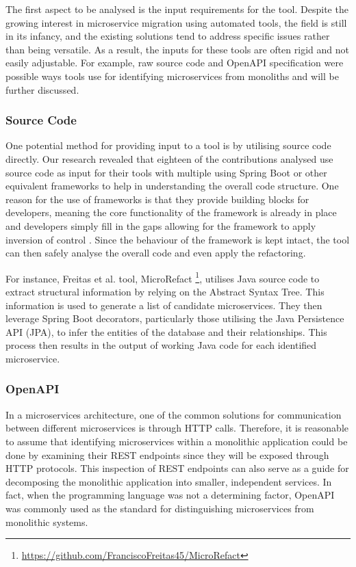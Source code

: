 \documentclass[conference]{IEEEtran}
\begin{document}
The first aspect to be analysed is the input requirements for the tool. Despite
the growing interest in microservice migration using automated tools, the field
is still in its infancy, and the existing solutions tend to address specific
issues rather than being versatile. As a result, the inputs for these tools are
often rigid and not easily adjustable. For example, raw source code and OpenAPI
specification were possible ways tools use for identifying microservices from
monoliths and will be further discussed.

\subsubsection*{Source Code}

One potential method for providing input to a tool is by utilising source code
directly. Our research revealed that eighteen of the contributions analysed use
source code as input for their tools with multiple using Spring Boot or other
equivalent frameworks to help in understanding the overall code structure. One
reason for the use of frameworks is that they provide building blocks for
developers, meaning the core functionality of the framework is already in place
and developers simply fill in the gaps allowing for the framework to apply
inversion of control \cite{gamma1995design}. Since the behaviour of the
framework is kept intact, the tool can then safely analyse the overall code and
even apply the refactoring.

For instance, Freitas et al.  tool, MicroRefact
\footnote{\url{https://github.com/FranciscoFreitas45/MicroRefact}}, utilises
Java source code to extract structural information by relying on the Abstract
Syntax Tree. This information is used to generate a list of candidate
microservices. They then leverage Spring Boot decorators, particularly those
utilising the Java Persistence API (JPA), to infer the entities of the database
and their relationships. This process then results in the output of working
Java code for each identified microservice.

\subsubsection*{OpenAPI}

In a microservices architecture, one of the common solutions for communication
between different microservices is through HTTP calls. Therefore, it is
reasonable to assume that identifying microservices within a monolithic
application could be done by examining their REST endpoints since they will be
exposed through HTTP protocols. This inspection of REST endpoints can also
serve as a guide for decomposing the monolithic application into smaller,
independent services. In fact, when the programming language was not a
determining factor, OpenAPI was commonly used as the standard for
distinguishing microservices from monolithic systems.
\end{document}
